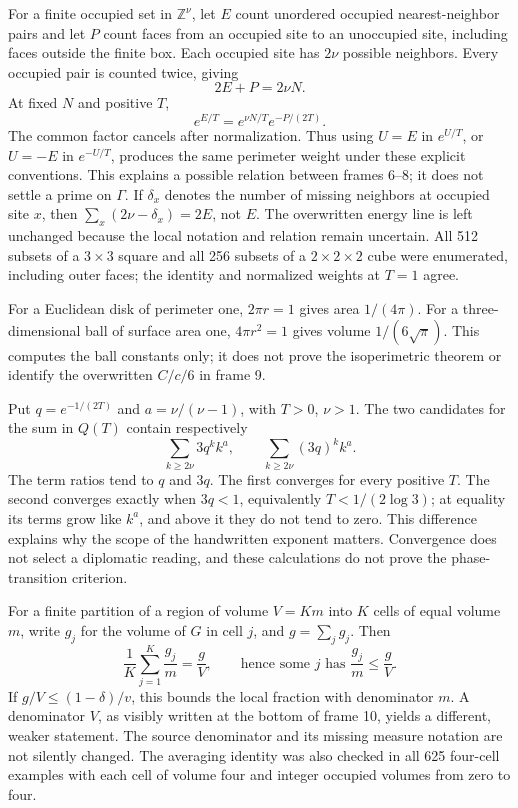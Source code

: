 \documentclass[11pt]{article}
\begin{document}
For a finite occupied set in \(\mathbb Z^\nu\), let \(E\) count unordered occupied nearest-neighbor pairs and let \(P\) count faces from an occupied site to an unoccupied site, including faces outside the finite box. Each occupied site has \(2\nu\) possible neighbors. Every occupied pair is counted twice, giving
\[2E+P=2\nu N.\]
At fixed \(N\) and positive \(T\),
\[e^{E/T}=e^{\nu N/T}e^{-P/(2T)}.\]
The common factor cancels after normalization. Thus using \(U=E\) in \(e^{U/T}\), or \(U=-E\) in \(e^{-U/T}\), produces the same perimeter weight under these explicit conventions. This explains a possible relation between frames 6–8; it does not settle a prime on \(\Gamma\). If \(\delta_x\) denotes the number of missing neighbors at occupied site \(x\), then \(\sum_x(2\nu-\delta_x)=2E\), not \(E\). The overwritten energy line is left unchanged because the local notation and relation remain uncertain. All 512 subsets of a \(3\times3\) square and all 256 subsets of a \(2\times2\times2\) cube were enumerated, including outer faces; the identity and normalized weights at \(T=1\) agree.

For a Euclidean disk of perimeter one, \(2\pi r=1\) gives area \(1/(4\pi)\). For a three-dimensional ball of surface area one, \(4\pi r^2=1\) gives volume \(1/(6\sqrt\pi)\). This computes the ball constants only; it does not prove the isoperimetric theorem or identify the overwritten \(C/c/6\) in frame 9.

Put \(q=e^{-1/(2T)}\) and \(a=\nu/(\nu-1)\), with \(T>0\), \(\nu>1\). The two candidates for the sum in \(Q(T)\) contain respectively
\[\sum_{k\ge2\nu}3q^k k^a,\qquad
  \sum_{k\ge2\nu}(3q)^k k^a.\]
The term ratios tend to \(q\) and \(3q\). The first converges for every positive \(T\). The second converges exactly when \(3q<1\), equivalently \(T<1/(2\log3)\); at equality its terms grow like \(k^a\), and above it they do not tend to zero. This difference explains why the scope of the handwritten exponent matters. Convergence does not select a diplomatic reading, and these calculations do not prove the phase-transition criterion.

For a finite partition of a region of volume \(V=Km\) into \(K\) cells of equal volume \(m\), write \(g_j\) for the volume of \(G\) in cell \(j\), and \(g=\sum_jg_j\). Then
\[\frac1K\sum_{j=1}^K\frac{g_j}{m}=\frac gV,\qquad
 \text{hence some }j\text{ has }\frac{g_j}{m}\le\frac gV.\]
If \(g/V\le(1-\delta)/v\), this bounds the local fraction with denominator \(m\). A denominator \(V\), as visibly written at the bottom of frame 10, yields a different, weaker statement. The source denominator and its missing measure notation are not silently changed. The averaging identity was also checked in all 625 four-cell examples with each cell of volume four and integer occupied volumes from zero to four.
\end{document}
